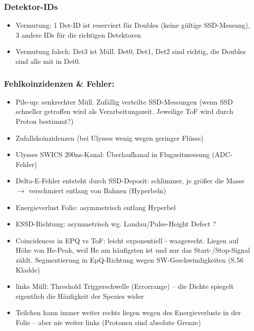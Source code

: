 \documentclass[]{article}
\begin{document}
\subsubsection{Detektor-IDs}
\begin{itemize}
	\item Vermutung: 1 Det-ID ist reserviert für Doubles (keine gültige SSD-Messung), 3 andere IDs für die richtigen Detektoren
	\item Vermutung falsch:
	Det3 ist Müll. Det0, Det1, Det2 sind richtig, die Doubles sind alle mit in Det0.
\end{itemize}
%
%
%
\subsubsection{Fehlkoinzidenzen \& Fehler:}
\begin{itemize}
	\item Pile-up: senkrechter Müll. Zufällig verteilte SSD-Messungen (wenn SSD schneller getroffen wird als Verarbeitungszeit. Jeweilige ToF wird durch Proton bestimmt?)
	\item Zufallskoinzidenzen (bei Ulysses wenig wegen geringer Flüsse)
	\item Ulysses SWICS 200ns-Kanal: Überlaufkanal in Flugzeitmessung (ADC-Fehler)
	\item Delta-E-Fehler entsteht durch SSD-Deposit: schlimmer, je größer die Masse $\rightarrow$ verschmiert entlang von Bahnen (Hyperbeln)
	\item Energieverlust Folie: asymmetrisch entlang Hyperbel
	\item ESSD-Richtung: asymmetrisch wg. Landau/Pulse-Height Defect ?
	\item Coincidences in EPQ vs ToF: leicht exponentiell - waagerecht. Liegen auf Höhe von He-Peak, weil  He am häufigsten ist und nur das Start-/Stop-Signal zählt. Segmentierung in EpQ-Richtung wegen SW-Geschwindigkeiten (S.56 Kladde)
	\item links Müll: Threshold Triggerschwelle (Errorrange) -- die Dichte spiegelt eigentlich die Häufigkeit der Spezies wider
	\item Teilchen kann immer weiter rechts liegen wegen des Energieverlusts in der Folie -- aber nie weiter links (Protonen sind absolute Grenze)
\end{itemize}
%
%
%
\end{document}
